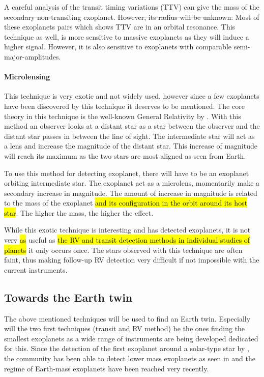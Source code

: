A careful analysis of the transit timing variations (TTV) can give the mass of the \st{secondary
non-}transiting exoplanet. \st{However, its radius will be unknown.} Most of these exoplanets pairs
which shows TTV are in an orbital resonance. This technique as well, is more sensitive to massive
exoplanets as they will induce a higher signal. However, it is also sensitive to exoplanets with
comparable semi-major-amplitudes.


\paragraph{Microlensing}

This technique is very exotic and not widely used, however since a few exoplanets have been
discovered by this technique it deserves to be mentioned. The core theory in this technique is the
well-known General Relativity by \citet{Einstein1916}. With this method an observer looks at a
distant star as a star between the observer and the distant star passes in between the line of
sight. The intermediate star will act as a lens and increase the magnitude of the distant star. This
increase of magnitude will reach its maximum as the two stars are most aligned as seen from Earth.

To use this method for detecting exoplanet, there will have to be an exoplanet orbiting intermediate
star. The exoplanet act as a microlens, momentarily make a secondary increase in magnitude. The
amount of increase in magnitude is related to the mass of the exoplanet \hl{and its configuration in
the orbit around its host star}. The higher the mass, the higher the effect.

While this exotic technique is interesting and has detected exoplanets, it is not \st{very} \hl{as}
useful as \hl{the RV and transit detection methods in individual studies of planets} it only occurs
once. The stars observed with this technique are often faint, thus making follow-up RV detection
very difficult if not impossible with the current instruments.


\subsection{Towards the Earth twin}

The above mentioned techniques will be used to find an Earth twin. Especially will the two first
techniques (transit and RV method) be the ones finding the smallest exoplanets as a wide range of
instruments are being developed dedicated for this. Since the detection of the first exoplanet
around a solar-type star by \citet{Mayor1995}, the community has been able to detect lower mass
exoplanets as seen in  and the regime of Earth-mass exoplanets have been
reached very recently.

